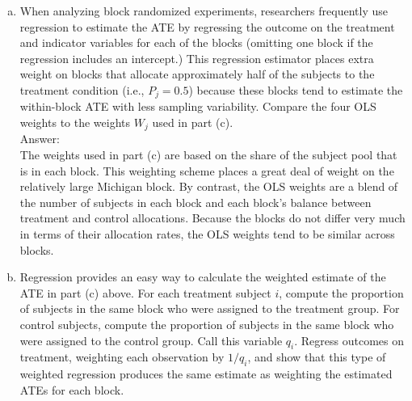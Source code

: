 \documentclass[11pt,notitlepage]{article}\usepackage[]{graphicx}\usepackage[]{color}
\makeatletter
\newenvironment{kframe}{%
 \def\at@end@of@kframe{}%
 \ifinner\ifhmode%
  \def\at@end@of@kframe{\end{minipage}}%
  \begin{minipage}{\columnwidth}%
 \fi\fi%
 \def\FrameCommand##1{\hskip\@totalleftmargin \hskip-\fboxsep
 \colorbox{shadecolor}{##1}\hskip-\fboxsep
     \hskip-\linewidth \hskip-\@totalleftmargin \hskip\columnwidth}%
 \MakeFramed {\advance\hsize-\width
   \@totalleftmargin\z@ \linewidth\hsize
   \@setminipage}}%
 {\par\unskip\endMakeFramed%
 \at@end@of@kframe}
\newenvironment{knitrout}{}{} %
\makeatother
\begin{document}
\begin{enumerate}[a)]
\begin{knitrout}
\begin{kframe}
\begin{Verbatim}[commandchars=\\\{\}]
        \PY{k}{qui}\PY{k}{ gen} overall\PYZus{}ate = ests\PY{o}{*}shareoftotalN
        \PY{k}{total}(overall\PYZus{}ate)
\end{Verbatim}

    \begin{Verbatim}[commandchars=\\\{\}]
        ests  shareof\textasciitilde{}N

Total estimation                  Number of obs   =          4

--------------------------------------------------------------
             |      Total   Std. Err.     [95\% Conf. Interval]
-------------+------------------------------------------------
 overall\_ate |  -.0078273   .0090322     -.0365719    .0209173
--------------------------------------------------------------

    \end{Verbatim}
\end{kframe}
\end{knitrout}

\item When analyzing block randomized experiments, researchers frequently use regression to estimate the ATE by regressing the outcome on the treatment and indicator variables for each of the blocks (omitting one block if the regression includes an intercept.)  This regression estimator places extra weight on blocks that allocate approximately half of the subjects to the treatment condition (i.e., $P_j  = 0.5$) because these blocks tend to estimate the within-block ATE with less sampling variability. Compare the four OLS weights to the weights $W_j$ used in part (c).\\
Answer:\\
The weights used in part (c) are based on the share of the subject pool that is in each block.  This weighting scheme places a great deal of weight on the relatively large Michigan block. By contrast, the OLS weights are a blend of the number of subjects in each block and each block's balance between treatment and control allocations. Because the blocks do not differ very much in terms of their allocation rates, the OLS weights tend to be similar across blocks.
\item Regression provides an easy way to calculate the weighted estimate of the ATE in part (c) above. For each treatment subject $i$, compute the proportion of subjects in the same block who were assigned to the treatment group.  For control subjects, compute the proportion of subjects in the same block who were assigned to the control group.  Call this variable $q_i$.  Regress outcomes on treatment, weighting each observation by $1/q_i$, and show that this type of weighted regression produces the same estimate as weighting the estimated ATEs for each block.


\end{enumerate}
\end{document}
